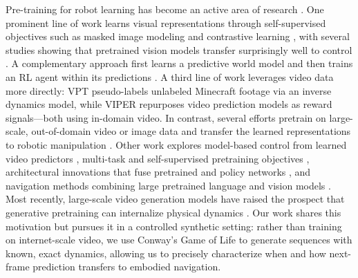 \newpage



Pre-training for robot learning has become an active area of research \citep{kumar2023pretrainingrobotsofflinerl}. One prominent line of work learns visual representations through self-supervised objectives such as masked image modeling \citep{xiao2022maskedvisualpretrainingmotor, radosavovic2022realworldrobotlearningmasked, seo2023maskedworldmodelsvisual, karamcheti2023languagedrivenrepresentationlearningrobotics, liu2023maskedautoencodingscalablegeneralizable} and contrastive learning \citep{nair2022r3muniversalvisualrepresentation, srinivas2020curlcontrastiveunsupervisedrepresentations, jing2023exploringvisualpretrainingrobot}, with several studies showing that pretrained vision models transfer surprisingly well to control \citep{parisi2022unsurprisingeffectivenesspretrainedvision, yenchen2021learninglearningactvisual, ma2023vipuniversalvisualreward}. A complementary approach first learns a predictive world model and then trains an RL agent within its predictions \citep{hafner2020dreamcontrollearningbehaviors, hafner2025trainingagentsinsidescalable, seo2023maskedworldmodelsvisual}. A third line of work leverages video data more directly: VPT \citep{baker2022videopretrainingvptlearning} pseudo-labels unlabeled Minecraft footage via an inverse dynamics model, while VIPER \citep{escontrela2023videopredictionmodelsrewards} repurposes video prediction models as reward signals---both using in-domain video. In contrast, several efforts pretrain on large-scale, out-of-domain video or image data and transfer the learned representations to robotic manipulation \citep{wu2023unleashinglargescalevideogenerative, brohan2023rt2visionlanguageactionmodelstransfer, du2023learninguniversalpoliciestextguided, radosavovic2023robotlearningsensorimotorpretraining}. Other work explores model-based control from learned video predictors \citep{du2023learninguniversalpoliciestextguided, mendonca2023structuredworldmodelshuman}, multi-task and self-supervised pretraining objectives \citep{sun2023smartselfsupervisedmultitaskpretraining, schwarzer2021pretrainingrepresentationsdataefficientreinforcement, thomas2023plexmakingavailabledata, bhateja2023roboticofflinerlinternet}, architectural innovations that fuse pretrained and policy networks \citep{lin2023spawnnetlearninggeneralizablevisuomotor}, and navigation methods combining large pretrained language and vision models \citep{shah2022lmnavroboticnavigationlarge}. Most recently, large-scale video generation models have raised the prospect that generative pretraining can internalize physical dynamics \citep{liu2024sorareviewbackgroundtechnology, ren2025videoworldexploringknowledgelearning, ren2026videoworld2learningtransferable}. Our work shares this motivation but pursues it in a controlled synthetic setting: rather than training on internet-scale video, we use Conway's Game of Life to generate sequences with known, exact dynamics, allowing us to precisely characterize when and how next-frame prediction transfers to embodied navigation.

